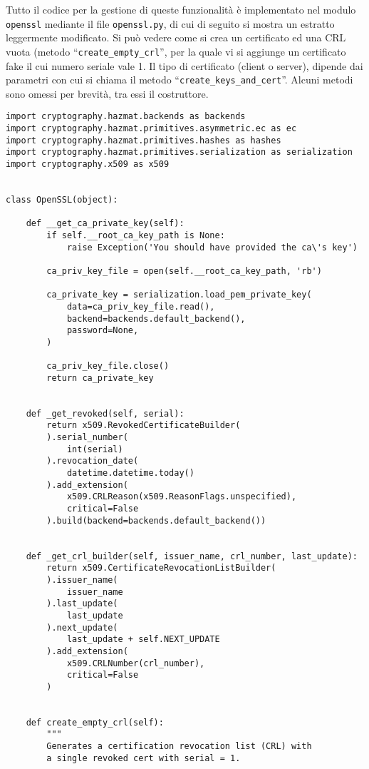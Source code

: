 Tutto il codice per la gestione di queste funzionalità è implementato nel modulo \texttt{openssl}
mediante il file \texttt{openssl.py}, di cui di seguito si mostra un estratto leggermente
modificato.
Si può vedere come si crea un certificato ed una CRL vuota (metodo
``\texttt{create\_empty\_crl}'', per la quale vi
si aggiunge un certificato fake il cui numero seriale vale 1.
Il tipo di certificato (client o server), dipende dai parametri con cui si chiama il metodo
``\texttt{create\_keys\_and\_cert}''.
Alcuni metodi sono omessi per brevità, tra essi il costruttore.
\begin{verbatim}
import cryptography.hazmat.backends as backends
import cryptography.hazmat.primitives.asymmetric.ec as ec
import cryptography.hazmat.primitives.hashes as hashes
import cryptography.hazmat.primitives.serialization as serialization
import cryptography.x509 as x509


class OpenSSL(object):

    def __get_ca_private_key(self):
        if self.__root_ca_key_path is None:
            raise Exception('You should have provided the ca\'s key')

        ca_priv_key_file = open(self.__root_ca_key_path, 'rb')

        ca_private_key = serialization.load_pem_private_key(
            data=ca_priv_key_file.read(),
            backend=backends.default_backend(),
            password=None,
        )

        ca_priv_key_file.close()
        return ca_private_key


    def _get_revoked(self, serial):
        return x509.RevokedCertificateBuilder(
        ).serial_number(
            int(serial)
        ).revocation_date(
            datetime.datetime.today()
        ).add_extension(
            x509.CRLReason(x509.ReasonFlags.unspecified),
            critical=False
        ).build(backend=backends.default_backend())


    def _get_crl_builder(self, issuer_name, crl_number, last_update):
        return x509.CertificateRevocationListBuilder(
        ).issuer_name(
            issuer_name
        ).last_update(
            last_update
        ).next_update(
            last_update + self.NEXT_UPDATE
        ).add_extension(
            x509.CRLNumber(crl_number),
            critical=False
        )    


    def create_empty_crl(self):
        """
        Generates a certification revocation list (CRL) with
        a single revoked cert with serial = 1.


\end{verbatim}

